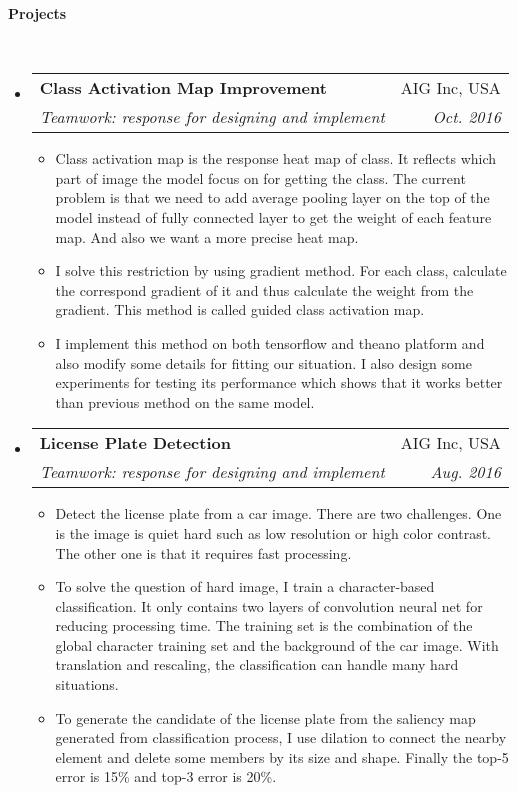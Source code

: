 \documentclass[a4paper,11pt]{article}
\makeatletter
\newcommand{\resitem}[1]{\item #1 \vspace{-2pt}}
\renewcommand{\normalsize}{\fontsize{12pt}{\baselineskip}\selectfont}
\newcommand{\resheading}[1]{{\large \colorbox{mygrey}{\begin{minipage}{\textwidth}{\textbf{#1 \vphantom{p\^{E}}}}\end{minipage}}}}
\newcommand{\ressubheading}[4]{
	\begin{tabular*}{6.5in}{l@{\extracolsep{\fill}}r}
		\textbf{#1} & #2 \\
		\textit{#3} & \textit{#4} \\
	\end{tabular*}\vspace{-6pt}}
\makeatother
\begin{document}
	\resheading{Projects}\\
	\begin{itemize}
		
		\item \ressubheading{{\normalsize Class Activation Map Improvement
			}}{AIG Inc, USA}{\normalsize Teamwork: response for designing and implement}{Oct. 2016}
			
			\begin{itemize}
				\resitem{Class activation map is the response heat map of class. It reflects which part of image the model focus on for getting the class. The current problem is that we need to add average pooling layer on the top of the model instead of fully connected layer to get the weight of each feature map. And also we want a more precise heat map.}
				\resitem{I solve this restriction by using gradient method. For each class, calculate the correspond gradient of it and thus calculate the weight from the gradient. This method is called guided class activation map.}
				\resitem{I implement this method on both tensorflow and theano platform and also modify some details for fitting our situation. I also design some experiments for testing its performance which shows that it works better than previous method on the same model.}
			\end{itemize}
			
			\item \ressubheading{{\normalsize License Plate Detection}}{AIG Inc, USA}{\normalsize Teamwork: response for designing and implement}{Aug. 2016}
			
			\begin{itemize}
				\resitem{Detect the license plate from a car image. There are two challenges. One is the image is quiet hard such as low resolution or high color contrast. The other one is that it requires fast processing.}
				\resitem{To solve the question of hard image, I train a character-based classification. It only contains two layers of convolution neural net for reducing processing time. The training set is the combination of the global character training set and the background of the car image. With translation and rescaling, the classification can handle many hard situations.}
				\resitem{To generate the candidate of the license plate from the saliency map generated from classification process, I use dilation to connect the nearby element and delete some members by its size and shape. Finally the top-5 error is 15\% and top-3 error is 20\%.}
			\end{itemize}
			

\end{itemize}
\end{document}
